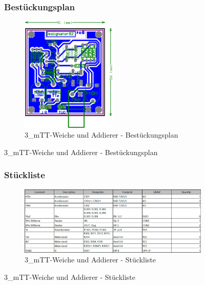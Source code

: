 \begin{figure}
	\subsubsection*{Bestückungsplan}
	\begin{figure} [H]
		\centering
		\includegraphics[width=0.5\textwidth]{img/Print3/3mTTWeicheruAddierer-Best.png}
		\caption{3\_mTT-Weiche und Addierer - Bestückungsplan}
		\label {fig:8.10.11}
	\end{figure}
\end{figure}

\begin{figure}
	\subsubsection*{Stückliste}
	\begin{figure} [H]
		\centering
		\includegraphics[width=1\textwidth]{img/Print3/3mTTWeicheruAddierer-Blist.png}
		\caption{3\_mTT-Weiche und Addierer - Stückliste}
		\label {fig:8.10.12}
	\end{figure}
\end{figure}


